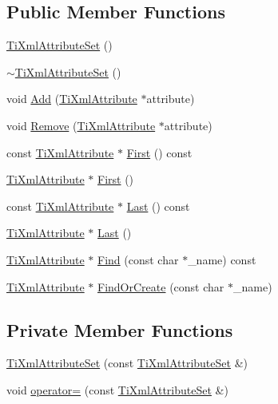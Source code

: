 \subsection*{Public Member Functions}
\begin{DoxyCompactItemize}
\item 
\hyperlink{classTiXmlAttributeSet_a253c33b657cc85a07f7f060b02146c35}{TiXmlAttributeSet} ()
\item 
\hyperlink{classTiXmlAttributeSet_add463905dff96142a29fe16a01ecf28f}{$\sim$TiXmlAttributeSet} ()
\item 
void \hyperlink{classTiXmlAttributeSet_a745e50ddaae3bee93e4589321e0b9c1a}{Add} (\hyperlink{classTiXmlAttribute}{TiXmlAttribute} $\ast$attribute)
\item 
void \hyperlink{classTiXmlAttributeSet_a924a73d071f2573f9060f0be57879c57}{Remove} (\hyperlink{classTiXmlAttribute}{TiXmlAttribute} $\ast$attribute)
\item 
const \hyperlink{classTiXmlAttribute}{TiXmlAttribute} $\ast$ \hyperlink{classTiXmlAttributeSet_ae0636e88cedd4b09d61c451860f68598}{First} () const 
\item 
\hyperlink{classTiXmlAttribute}{TiXmlAttribute} $\ast$ \hyperlink{classTiXmlAttributeSet_a99703bb08ca2aece2d7ef835de339ba0}{First} ()
\item 
const \hyperlink{classTiXmlAttribute}{TiXmlAttribute} $\ast$ \hyperlink{classTiXmlAttributeSet_a7b3f3ccf39a97bc25539d3fcc540296a}{Last} () const 
\item 
\hyperlink{classTiXmlAttribute}{TiXmlAttribute} $\ast$ \hyperlink{classTiXmlAttributeSet_ab4c4edfb2d74f6ea31aae096743bd6e0}{Last} ()
\item 
\hyperlink{classTiXmlAttribute}{TiXmlAttribute} $\ast$ \hyperlink{classTiXmlAttributeSet_af3675cc2bfd0aea153cda1cfcdd1f77e}{Find} (const char $\ast$\_\-name) const 
\item 
\hyperlink{classTiXmlAttribute}{TiXmlAttribute} $\ast$ \hyperlink{classTiXmlAttributeSet_a5e28f5d32f048fba85d04dc317495bdc}{FindOrCreate} (const char $\ast$\_\-name)
\end{DoxyCompactItemize}
\subsection*{Private Member Functions}
\begin{DoxyCompactItemize}
\item 
\hyperlink{classTiXmlAttributeSet_acb244bc616c28b1c4b8e8417f28e5f9e}{TiXmlAttributeSet} (const \hyperlink{classTiXmlAttributeSet}{TiXmlAttributeSet} \&)
\item 
void \hyperlink{classTiXmlAttributeSet_a977f5b50c94e7b6beb01875298fa14a2}{operator=} (const \hyperlink{classTiXmlAttributeSet}{TiXmlAttributeSet} \&)
\end{DoxyCompactItemize}
